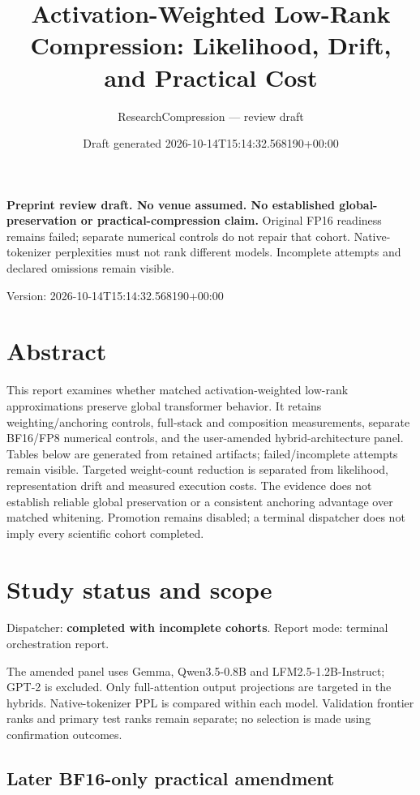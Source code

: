 \documentclass[10pt]{article}
\title{Activation-Weighted Low-Rank Compression: Likelihood, Drift, and Practical Cost}
\author{ResearchCompression --- review draft}
\date{Draft generated 2026-10-14T15:14:32.568190+00:00}
\begin{document}
\maketitle
\noindent\textbf{Preprint review draft. No venue assumed. No established global-preservation or practical-compression claim.}
Original FP16 readiness remains failed; separate numerical controls do not repair that cohort. Native-tokenizer perplexities must not rank different models. Incomplete attempts and declared omissions remain visible.


Version: 2026-10-14T15:14:32.568190+00:00

\section{Abstract}

This report examines whether matched activation-weighted low-rank approximations preserve global transformer behavior. It retains weighting/anchoring controls, full-stack and composition measurements, separate BF16/FP8 numerical controls, and the user-amended hybrid-architecture panel. Tables below are generated from retained artifacts; failed/incomplete attempts remain visible. Targeted weight-count reduction is separated from likelihood, representation drift and measured execution costs. The evidence does not establish reliable global preservation or a consistent anchoring advantage over matched whitening. Promotion remains disabled; a terminal dispatcher does not imply every scientific cohort completed.

\section{Study status and scope}

Dispatcher: \textbf{completed with incomplete cohorts}. Report mode: terminal orchestration report.

The amended panel uses Gemma, Qwen3.5-0.8B and LFM2.5-1.2B-Instruct; GPT-2 is excluded. Only full-attention output projections are targeted in the hybrids. Native-tokenizer PPL is compared within each model. Validation frontier ranks and primary test ranks remain separate; no selection is made using confirmation outcomes.

\subsection{Later BF16-only practical amendment}
\end{document}
